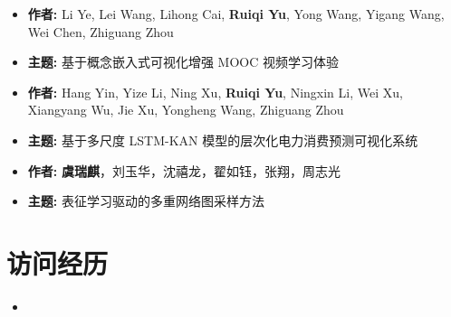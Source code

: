\documentclass[AutoFakeBold]{resume}
\begin{document}
\begin{itemize}
    \item \textbf{\kaishu 作者:} \kaishu Li Ye, Lei Wang, Lihong Cai, \textbf{Ruiqi Yu}, Yong Wang, Yigang Wang, Wei Chen, Zhiguang Zhou
    \item \textbf{\kaishu 主题:} \kaishu 基于概念嵌入式可视化增强 MOOC 视频学习体验
\end{itemize}
\begin{itemize}
    \item \textbf{\kaishu 作者:} \kaishu Hang Yin, Yize Li, Ning Xu, \textbf{Ruiqi Yu}, Ningxin Li, Wei Xu, Xiangyang Wu, Jie Xu, Yongheng Wang, Zhiguang Zhou
    \item \textbf{\kaishu 主题:} \kaishu 基于多尺度 LSTM-KAN 模型的层次化电力消费预测可视化系统
\end{itemize}
\begin{itemize}
    \item \textbf{\kaishu 作者:} \kaishu \textbf{虞瑞麒}，刘玉华，沈禧龙，翟如钰，张翔，周志光
    \item \textbf{\kaishu 主题:} \kaishu 表征学习驱动的多重网络图采样方法
\end{itemize}
\section{\makebox[.75em][c]{\faTrophy} \textbf{\fangsong 访问经历}}
\vspace{.5mm}
\begin{itemize}
    \item {}
\end{itemize}
\end{document}
